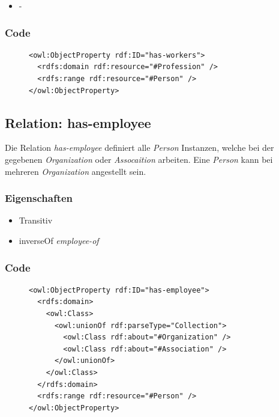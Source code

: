 \documentclass[
    11pt,
    latin1,
    a4paper,
    oneside
]{scrreprt}
\begin{document}
\begin{itemize}
  \item -
\end{itemize}

\subsubsection{Code} \label{sec:rel_hasworkers_code}

\begin{figure}[H]
 \lstset{language=XML}
 \begin{lstlisting}[label=owl:hasworkers,caption={Die Relation \emph{has-workers} gibt an, welche \emph{Person} welche \emph{Profession} beherrscht oder aus\"ubt}]
<owl:ObjectProperty rdf:ID="has-workers">
  <rdfs:domain rdf:resource="#Profession" />
  <rdfs:range rdf:resource="#Person" />
</owl:ObjectProperty>
 \end{lstlisting}
\end{figure}


\subsection{Relation: has-employee} \label{sec:rel_hasemployee}

Die Relation \emph{has-employee} definiert alle \emph{Person} Instanzen, welche bei der gegebenen \emph{Organization} oder \emph{Assocaition} arbeiten. Eine \emph{Person} kann bei mehreren \emph{Organization} angestellt sein.

\subsubsection{Eigenschaften} \label{sec:rel_hasemployee_settings}

\begin{itemize}
  \item Transitiv
  \item inverseOf \emph{employee-of}
\end{itemize}

\subsubsection{Code} \label{sec:rel_hasemployee_code}

\begin{figure}[H]
 \lstset{language=XML}
 \begin{lstlisting}[label=owl:hasemployee,caption={Die Relation \emph{has-employee} gibt an, welche \emph{Person} bei der \emph{Organization} oder \emph{Association} angestellt sind}]
<owl:ObjectProperty rdf:ID="has-employee">
  <rdfs:domain>
    <owl:Class>
      <owl:unionOf rdf:parseType="Collection">
        <owl:Class rdf:about="#Organization" />
        <owl:Class rdf:about="#Association" />
      </owl:unionOf>
    </owl:Class>
  </rdfs:domain>
  <rdfs:range rdf:resource="#Person" />
</owl:ObjectProperty>
 \end{lstlisting}
\end{figure}
\end{document}

